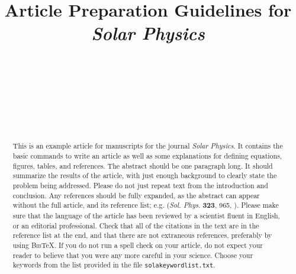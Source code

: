 \documentclass[namedreferences,hyperref,optionalrh]{spr-sola}
\newcommand{\BibTeX}{\textsc{Bib}\TeX}
\newcommand{\solphys}{{\it Sol. Phys.}}
\begin{document}
\begin{frontmatter}
\title{Article Preparation Guidelines for {\it Solar Physics}}

\author[addressref={aff1,aff2,aff3},email={e-mail.a@mail.com}]{~}
\author[addressref=aff1,email={e-mail.b@mail.com}]{~}
\author[addressref=aff2,corref,email={e-mail.c@mail.com}]{~}
\author[addressref=aff3]{~}
\address[id=aff1]{First very very very very very very very very very
 very very very very very very very very very very very very very very very very very very long affiliation and address}
\address[id=aff2]{Institution, City, State, Country}
\address[id=aff3]{Third affiliation and address}


\begin{abstract}
This is an example article for manuscripts for the journal {\it Solar 
Physics}. It contains the basic commands to write an article as well 
as some explanations for defining equations, figures, tables,
and references.    
The abstract should be one paragraph long.  It should summarize
the results of the article, with just enough background to clearly state the
problem being addressed.
Please do not just repeat text from the introduction and conclusion.
Any references should be fully expanded, as the abstract can appear 
without the full article, and its reference list; 
e.g. \citeauthor{Dupont07} (\solphys{} \textbf{323}, 965, 
\citeyear{Dupont07}).
Please make sure that the language of the article has been reviewed by a
scientist fluent in English, or an editorial professional.
Check that all of the citations in the text are in the reference list at the
end, and that there are not extraneous references, preferably by using 
\BibTeX . If you do not run a spell check on your article, do not expect 
your reader to believe that you were any more careful in your science. 
Choose your keywords from the list provided in the file 
\texttt{sola\us keyword\us list.txt}.  
\end{abstract}
\end{frontmatter}
\end{document}
